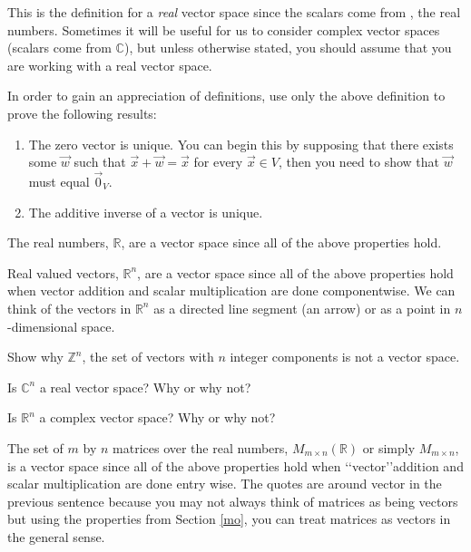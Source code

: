 This is the definition for a \emph{real} vector space since the scalars come from \R, the real numbers. Sometimes it will be useful for us to consider complex vector spaces (scalars come from $\mathbb{C}$), but unless otherwise stated, you should assume that you are working with a real vector space.

\bq
In order to gain an appreciation of definitions, use only the above definition to prove the following results:
\begin{enumerate}
\item The zero vector is unique. You can begin this by supposing that there exists some $\vec{w}$ such that $\vec{x} +\vec{w} = \vec{x}$ for every $\vec{x} \in V$, then you need to show that $\vec{w}$ must equal $\vec{0}_V$.
\item The additive inverse of a vector is unique.
\end{enumerate}
\eq

\begin{example}
The real numbers, $\mathbb{R}$, are a vector space since all of the above properties hold.
\end{example}
\begin{example}
Real valued vectors, $\mathbb{R}^n$, are a vector space since all of the above properties hold when vector addition and scalar multiplication are done componentwise. We can think of the vectors in $\mathbb{R}^n$ as a directed line segment (an arrow) or as a point in $n$-dimensional space.
\end{example}

\bq Show why $\mathbb{Z}^n$, the set of vectors with $n$ integer components is not a vector space.
\eq

\bq Is $\mathbb{C}^n$ a real vector space? Why or why not?
\eq

\bq Is $\mathbb{R}^n$ a complex vector space? Why or why not?
\eq

\begin{example}
The set of $m$ by $n$ matrices over the real numbers, $M_{m \times n}(\mathbb{R})$ or simply $M_{m \times n}$, is a vector space since all of the above properties hold when \lq\lq{vector}\rq\rq addition and scalar multiplication are done entry wise. The quotes are around vector in the previous sentence because you may not always think of matrices as being vectors but using the properties from Section \ref{mo}, you can treat matrices as vectors in the general sense.
\end{example}

